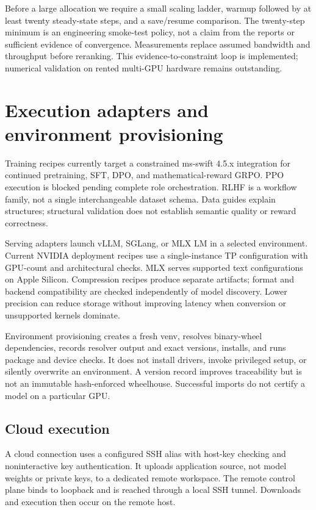 \documentclass[10pt]{article}
\begin{document}
Before a large allocation we require a small scaling ladder, warmup followed by at least twenty steady-state steps, and a save/resume comparison. The twenty-step minimum is an engineering smoke-test policy, not a claim from the reports or sufficient evidence of convergence. Measurements replace assumed bandwidth and throughput before reranking. This evidence-to-constraint loop is implemented; numerical validation on rented multi-GPU hardware remains outstanding.

\section{Execution adapters and environment provisioning}
Training recipes currently target a constrained ms-swift 4.5.x integration for continued pretraining, SFT, DPO, and mathematical-reward GRPO. PPO execution is blocked pending complete role orchestration. RLHF is a workflow family, not a single interchangeable dataset schema. Data guides explain structures; structural validation does not establish semantic quality or reward correctness.

Serving adapters launch vLLM, SGLang, or MLX LM in a selected environment. Current NVIDIA deployment recipes use a single-instance TP configuration with GPU-count and architectural checks. MLX serves supported text configurations on Apple Silicon. Compression recipes produce separate artifacts; format and backend compatibility are checked independently of model discovery. Lower precision can reduce storage without improving latency when conversion or unsupported kernels dominate.

Environment provisioning creates a fresh venv, resolves binary-wheel dependencies, records resolver output and exact versions, installs, and runs package and device checks. It does not install drivers, invoke privileged setup, or silently overwrite an environment. A version record improves traceability but is not an immutable hash-enforced wheelhouse. Successful imports do not certify a model on a particular GPU.

\subsection{Cloud execution}
A cloud connection uses a configured SSH alias with host-key checking and noninteractive key authentication. It uploads application source, not model weights or private keys, to a dedicated remote workspace. The remote control plane binds to loopback and is reached through a local SSH tunnel. Downloads and execution then occur on the remote host.
\end{document}
